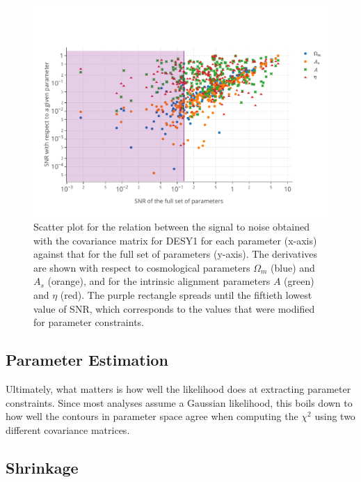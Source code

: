 \documentclass[twocolumn]{\docclass}
\begin{document}
\begin{figure}
\includegraphics[width=1\columnwidth]{SNR_cuts.pdf}
\caption{Scatter plot for the relation between the signal to noise obtained with the covariance matrix for DESY1 for each parameter (x-axis) against that for the full set of parameters (y-axis). The derivatives are shown with respect to cosmological parameters $\Omega_m$ (blue) and $A_s$ (orange), and for the intrinsic alignment parameters $A$ (green) and $\eta$ (red). The purple rectangle spreads until the fiftieth lowest value of SNR, which corresponds to the values that were modified for parameter constraints. \label{fig:signalnoise_cuts}}
\end{figure}


\subsection{Parameter Estimation}

Ultimately, what matters is how well the likelihood does at extracting parameter constraints. Since most analyses assume a Gaussian likelihood, this boils down to how well the contours in parameter space agree when computing the $\chi^2$ using two different covariance matrices.

\subsection{Shrinkage}

\end{document}
